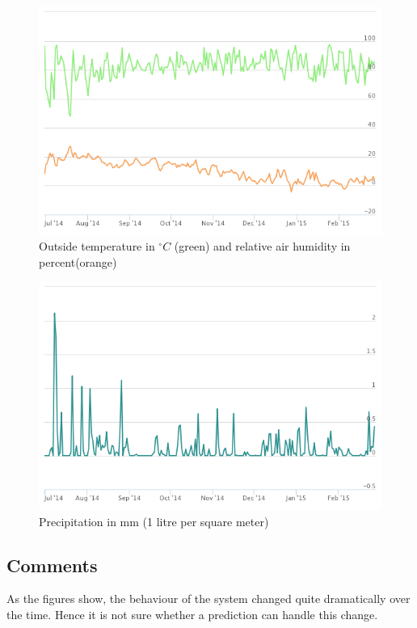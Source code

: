 \documentclass{scrartcl}
\begin{document}
\begin{figure}[H]
  \centering
  \includegraphics[width=0.8\linewidth]{img/temp_feuchte.png}
  \caption{Outside temperature in $^\circ C$ (green) and relative air humidity in percent(orange)}
\end{figure}

\begin{figure}[H]
  \centering
  \includegraphics[width=0.8\linewidth]{img/niederschlag.png}
  \caption{Precipitation in mm (1 litre per square meter)}
\end{figure}

\subsection{Comments}
As the figures show, the behaviour of the system changed quite dramatically over the time. Hence it is not sure whether a prediction can handle this change.



\end{document}
